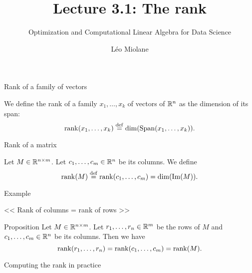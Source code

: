 \documentclass{beamer}
\title{Lecture 3.1: The rank}
\subtitle{Optimization and Computational Linear Algebra for Data Science}
\author{Léo Miolane}
\date{}
\begin{document}
\setcounter{showProgressBar}{0}
\setcounter{showSlideNumbers}{0}

\frame{\titlepage}


\setcounter{framenumber}{0}
\setcounter{showSlideNumbers}{1}


\begin{frame}[t]{Rank of a family of vectors}
	\begin{definition}
		We define the rank of a family $x_1, \dots, x_k$ of vectors of $\mathbb{R}^n$ as the dimension of its span:
		$$
		{{\rm rank}}(x_1, \dots, x_k) \overset{\rm def}{=} {{\rm dim}} ({{\rm Span}}(x_1, \dots, x_k)).
		$$
	\end{definition}
\end{frame}

\begin{frame}[t]{Rank of a matrix}
	\begin{definition}
		Let $M \in \mathbb{R}^{n \times m}$. Let $c_1, \dots, c_m \in \mathbb{R}^n$ be its columns.
		We define
		$$
		{{\rm rank}}(M) \overset{\rm def}{=} {{\rm rank}}(c_1, \dots, c_m) = {{\rm dim}}({{\rm Im}}(M)).
		$$
	\end{definition}
\end{frame}

\begin{frame}{Example}
\end{frame}

\begin{frame}[t]{<< Rank of columns = rank of rows >>}
	\begin{block}{Proposition}
		Let $M \in \mathbb{R}^{n \times m}$. Let $r_1, \dots, r_n \in \mathbb{R}^m$ be the rows of $M$ and $c_1, \dots, c_m \in \mathbb{R}^n$ be its columns.
		Then we have
		$$
		{{\rm rank}}(r_1, \dots, r_n) = {{\rm rank}}(c_1, \dots, c_m) = {{\rm rank}}(M).
		$$
	\end{block}
\end{frame}

\begin{frame}{Computing the rank in practice}
	\pause
\end{frame}
\end{document}
